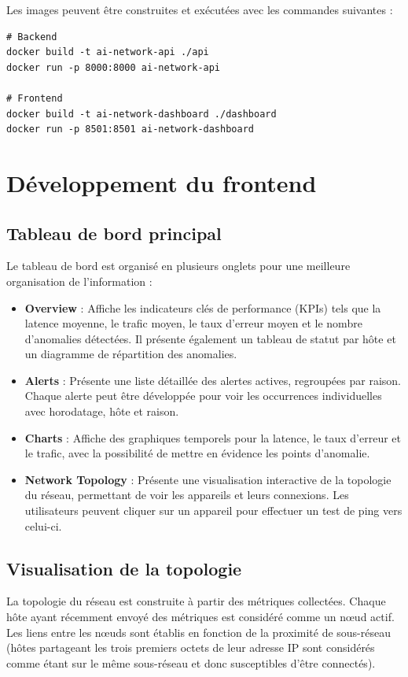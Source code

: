 \documentclass[12pt,a4paper]{report}
\begin{document}
Les images peuvent être construites et exécutées avec les commandes suivantes :
\begin{verbatim}
# Backend
docker build -t ai-network-api ./api
docker run -p 8000:8000 ai-network-api

# Frontend
docker build -t ai-network-dashboard ./dashboard
docker run -p 8501:8501 ai-network-dashboard
\end{verbatim}

\section{Développement du frontend}
\subsection{Tableau de bord principal}
Le tableau de bord est organisé en plusieurs onglets pour une meilleure organisation de l'information :
\begin{itemize}
    \item \textbf{Overview} : Affiche les indicateurs clés de performance (KPIs) tels que la latence moyenne, le trafic moyen, le taux d'erreur moyen et le nombre d'anomalies détectées. Il présente également un tableau de statut par hôte et un diagramme de répartition des anomalies.
    \item \textbf{Alerts} : Présente une liste détaillée des alertes actives, regroupées par raison. Chaque alerte peut être développée pour voir les occurrences individuelles avec horodatage, hôte et raison.
    \item \textbf{Charts} : Affiche des graphiques temporels pour la latence, le taux d'erreur et le trafic, avec la possibilité de mettre en évidence les points d'anomalie.
    \item \textbf{Network Topology} : Présente une visualisation interactive de la topologie du réseau, permettant de voir les appareils et leurs connexions. Les utilisateurs peuvent cliquer sur un appareil pour effectuer un test de ping vers celui-ci.
\end{itemize}

\subsection{Visualisation de la topologie}
La topologie du réseau est construite à partir des métriques collectées. Chaque hôte ayant récemment envoyé des métriques est considéré comme un nœud actif. Les liens entre les nœuds sont établis en fonction de la proximité de sous-réseau (hôtes partageant les trois premiers octets de leur adresse IP sont considérés comme étant sur le même sous-réseau et donc susceptibles d'être connectés).
\end{document}
